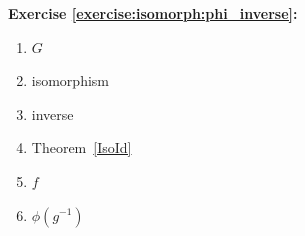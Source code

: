 \noindent\textbf{Exercise \ref{exercise:isomorph:phi_inverse}:}
%

\begin{multicols}{3}
\begin{enumerate}
\item
$G$

\item
isomorphism

\item
inverse

\item
Theorem~\ref{IsoId}

\item
$f$

\item
$\phi(g^{-1})$
\end{enumerate}
\end{multicols}

